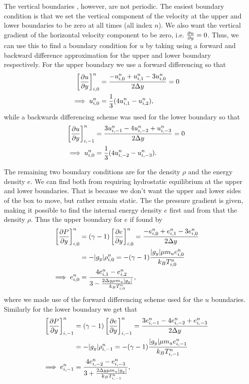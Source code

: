 \documentclass{emulateapj}
\begin{document}
	The vertical boundaries , however, are not periodic. The easiest boundary condition is that we set the vertical component of the velocity at the upper and lower boundaries to be zero at all times (all index $n$). We also want the vertical gradient of the horizontal velocity component to be zero, i.e. $\pdv{u}{y} = 0$. Thus, we can use this to find a boundary condition for $u$ by taking using a forward and backward difference approximation for the upper and lower boundary respectively. For the upper boundary we use a forward differencing so that 
	\begin{align}
		\left[\pdv{u}{y}\right]^n_{i,0} &= \frac{- u^n_{i, 0} + u^n_{i, 1} - 3u^n_{i, 0}}{2\Delta y} = 0\\
		\implies u^n_{i, 0} &= \frac{1}{3}(4 u^n_{i,1} - u^n_{i, 2}),
	\end{align}
	while a backwards differencing scheme was used for the lower boundary so that
	\begin{align}
		\left[\pdv{u}{y}\right]^n_{i, -1} &= \frac{3 u^n_{i, -1} -4 u^n_{i, -2} + u^n_{i, -3}}{2\Delta y} = 0\\
		\implies u^n_{i, 0} &= \frac{1}{3}(4 u^n_{i,-2} - u^n_{i, -3}).
	\end{align}
	
	The remaining two boundary conditions are for the density $\rho$ and the energy density $e$. We can find both from requiring hydrostatic equilibrium at the upper and lower boundaries. That is because we don't want the upper and lower sides of the box to move, but rather remain static. The the pressure gradient is given, making it possible to find the internal energy density $e$ first and from that the density $\rho$. Thus the upper boundary for $e$ if found by
	\begin{align}
		\left[\pdv{P}{y}\right]^n_{i, 0} &= (\gamma - 1)\left[\pdv{e}{y}\right]^n_{i, 0} = \frac{- e^n_{i, 0} + e^n_{i, 1} - 3e^n_{i, 0}}{2\Delta y}\nonumber\\
		&= -|g_y|\rho^n_{i,0} = -(\gamma - 1)\frac{|g_y|\mu m_u e^n_{i,0}}{k_B T^n_{i,0}}\nonumber\\
		\implies e^n_{i,0} &= \frac{4 e^n_{i,1} - e^n_{i,2}}{3 - \frac{2\Delta y\mu m_u |g_y|}{k_BT^n_{i,0}}}, 
	\end{align}
	where we made use of the forward differencing scheme used for the $u$ boundaries. Similarly for the lower boundary we get that 
	\begin{align}
		\left[\pdv{P}{y}\right]^n_{i, -1} &= (\gamma - 1)\left[\pdv{e}{y}\right]^n_{i, -1} = \frac{3e^n_{i, -1} -4 e^n_{i, -2} +e^n_{i, -3}}{2\Delta y}\nonumber\\
		&= -|g_y|\rho^n_{i,-1} = -(\gamma - 1)\frac{|g_y|\mu m_u e^n_{i,-1}}{k_B T^n_{i,-1}}\nonumber\\
		\implies e^n_{i,-1} &= \frac{4 e^n_{i,-2} - e^n_{i,-3}}{3 + \frac{2\Delta y\mu m_u |g_y|}{k_BT^n_{i,-1}}}, 
	\end{align}
	
\end{document}
